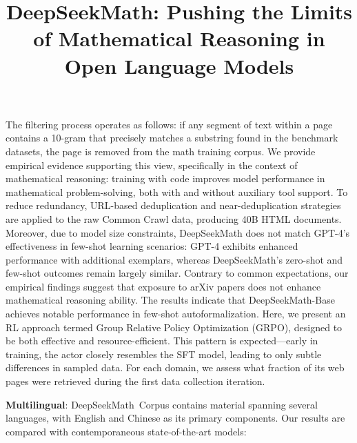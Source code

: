 \title{DeepSeekMath: Pushing the Limits of Mathematical Reasoning in Open Language Models}
The filtering process operates as follows: if any segment of text within a page contains a 10-gram that precisely matches a substring found in the benchmark datasets, the page is removed from the math training corpus. We provide empirical evidence supporting this view, specifically in the context of mathematical reasoning: training with code improves model performance in mathematical problem-solving, both with and without auxiliary tool support. To reduce redundancy, URL-based deduplication and near-deduplication strategies are applied to the raw Common Crawl data, producing 40B HTML documents. Moreover, due to model size constraints, DeepSeekMath does not match GPT-4’s effectiveness in few-shot learning scenarios: GPT-4 exhibits enhanced performance with additional exemplars, whereas DeepSeekMath's zero-shot and few-shot outcomes remain largely similar. Contrary to common expectations, our empirical findings suggest that exposure to arXiv papers does not enhance mathematical reasoning ability. The results indicate that DeepSeekMath-Base achieves notable performance in few-shot autoformalization. Here, we present an RL approach termed Group Relative Policy Optimization (GRPO), designed to be both effective and resource-efficient. This pattern is expected—early in training, the actor closely resembles the SFT model, leading to only subtle differences in sampled data. For each domain, we assess what fraction of its web pages were retrieved during the first data collection iteration. \item \textbf{Multilingual}:
    DeepSeekMath~Corpus contains material spanning several languages, with English and Chinese as its primary components. Our results are compared with contemporaneous state-of-the-art models:

